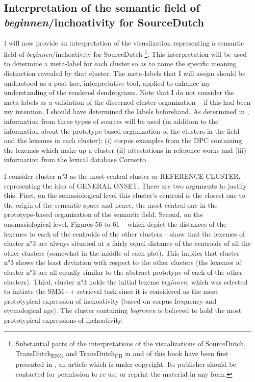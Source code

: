\subsection{Interpretation of the semantic field of \textit{beginnen}\slash inchoativity for SourceDutch}
\label{sec:4.2.4}  
I will now provide an interpretation of the visualization representing a semantic field of \textit{beginnen}/inchoativity for SourceDutch \footnote{Substantial parts of the interpretations of the visualizations of SourceDutch, TransDutch\textsubscript{ENG} and TransDutch\textsubscript{FR} in   and  of this book have been first presented in \citep{vandevoorde_corpus-based_2017}, an article which is under copyright. Its publisher should be contacted for permission to re-use or reprint the material in any form.}. This interpretation will be used to determine a meta-label for each cluster so as to name the specific meaning distinction revealed by that cluster. The meta-labels that I will assign should be understood as a post-hoc, interpretative tool, applied to enhance my understanding of the rendered dendrograms. Note that I do not consider the meta-labels as a validation of the discerned cluster organization – if this had been my intention, I should have determined the labels beforehand. As determined in , information from three types of sources will be used (in addition to the information about the prototype-based organization of the clusters in the field and the lexemes in each cluster): (i) corpus examples from the DPC containing the lexemes which make up a cluster (ii) attestations in reference works and (iii) information from the lexical database Cornetto \citep{vossen_cornetto_2008, spyns_cornetto:_2013}. 

I consider cluster n°3 as the most central cluster or REFERENCE CLUSTER, representing the idea of GENERAL ONSET. There are two arguments to justify this. First, on the semasiological level this cluster’s centroid is the closest one to the origin of the semantic space and hence, the most central one in the prototype-based organization of the semantic field. Second, on the onomasiological level, Figures 56 to 61 – which depict the distances of the lexemes to each of the centroids of the other clusters – show that the lexemes of cluster n°3 are always situated at a fairly equal distance of the centroids of all the other clusters (somewhat in the middle of each plot). This implies that cluster n°3 shows the least deviation with respect to the other clusters (the lexemes of cluster n°3 are all equally similar to the abstract prototype of each of the other clusters). Third, cluster n°3 holds the initial lexeme \textit{beginnen}, which was selected to initiate the SMM++ retrieval task since it is considered as the most prototypical expression of inchoativity (based on corpus frequency and etymological age). The cluster containing \textit{beginnen} is believed to hold the most prototypical expressions of inchoativity.

